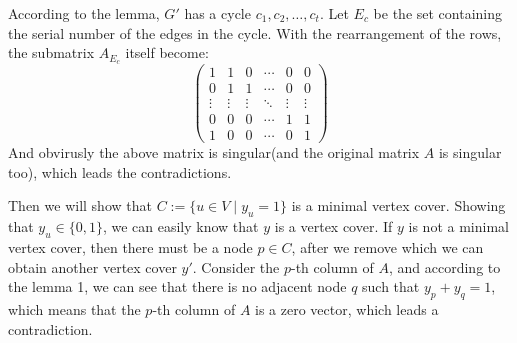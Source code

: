 According to the lemma, $G'$ has a cycle $c_1, c_2, \dots, c_t$. Let $E_c$ be the set containing the serial number of the edges in the cycle. With the rearrangement of the rows, the submatrix $A_{E_c}$ itself become:
\[
\begin{pmatrix}
      1    &    1   &    0   & \cdots &    0   &    0   \\
      0    &    1   &    1   & \cdots &    0   &    0   \\
    \vdots & \vdots & \vdots & \ddots & \vdots & \vdots \\
      0    &    0   &    0   & \cdots &    1   &    1   \\
      1    &    0   &    0   & \cdots &    0   &    1
\end{pmatrix}
\]
And obvirusly the above matrix is singular(and the original matrix $A$ is singular too), which leads the contradictions.\par
Then we will show that $C:=\{u \in V \mid y_u = 1\}$ is a minimal vertex cover. Showing that $y_u \in \{0, 1\}$, we can easily know that $y$ is a vertex cover. If $y$ is not a minimal vertex cover, then there must be a node $p \in C$, after we remove which we can obtain another vertex cover $y'$. Consider the $p$-th column of $A$, and according to the lemma 1, we can see that there is no adjacent node $q$ such that $y_p + y_q = 1$, which means that the $p$-th column of $A$ is a zero vector, which leads a contradiction.
